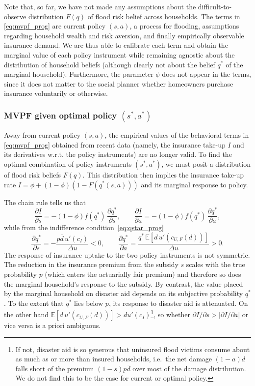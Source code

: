 \documentclass[12pt]{article}
\begin{document}
Note that, so far, we have not made any assumptions about the difficult-to-observe distribution $F(q)$ of flood risk belief across households. The terms in \eqref{eq:mvpf_prog} are current policy $(s,a)$, a process for flooding, assumptions regarding household wealth and risk aversion, and finally empirically observable insurance demand. We are thus able to calibrate each term and obtain the marginal value of each policy instrument while remaining agnostic about the distribution of household beliefs (although clearly not about the belief $q^*$ of the marginal household). Furthermore, the parameter $\phi$ does not appear in the terms, since it does not matter to the social planner whether homeowners purchase insurance voluntarily or otherwise.

\subsubsection{MVPF given optimal policy \texorpdfstring{$(s^*,a^*)$}{(s*,a*)}}
Away from current policy $(s,a)$, the empirical values of the behavioral terms in \eqref{eq:mvpf_prog} obtained from recent data (namely, the insurance take-up $I$ and its derivatives w.r.t. the policy instruments) are no longer valid. To find the optimal combination of policy instruments $(s^*,a^*)$, we must posit a distribution of flood risk beliefs $F(q)$. This distribution then implies the insurance take-up rate $I=\phi+(1-\phi)(1-F(q^*(s,a)))$ and its marginal response to policy.

The chain rule tells us that 
\begin{equation}\label{eq:partialsinsurance}
    \frac{\partial I}{\partial s} = -(1-\phi)f(q^*)\,\frac{\partial q^*}{\partial s}, \qquad
    \frac{\partial I}{\partial a} = -(1-\phi)f(q^*)\,\frac{\partial q^*}{\partial a},
\end{equation}
while from the indifference condition~\eqref{eq:qstar_prog} 
\begin{equation}\label{eq:partialsqstar}
    \frac{\partial q^*}{\partial s} = -\frac{p\overline{d}\,u'(c_I)}{\Delta u} < 0, \qquad
    \frac{\partial q^*}{\partial a} = \frac{q^*\,\mathbb{E}[d\,u'(c_{U,F}(d))]}{\Delta u} > 0.
\end{equation}
The response of insurance uptake to the two policy instruments is not symmetric. The reduction in the insurance premium from the subsidy $s$ scales with the true probability $p$ (which enters the actuarially fair premium) and therefore so does the marginal household's response to the subsidy. By contrast, the value placed by the marginal household on disaster aid depends on its subjective probability $q^*$. To the extent that $q^*$ lies below $p$, its response to disaster aid is attenuated. On the other hand $\mathbb{E}[d\,u'(c_{U,F}(d))]>\overline{d}u'(c_I)$\footnote{If not, disaster aid is so generous that uninsured flood victims consume about as much as or more than insured households, i.e.\ the net damage $(1-a)d$ falls short of the premium $(1-s)p\overline{d}$ over most of the damage distribution. We do not find this to be the case for current or optimal policy.}, so whether $\partial I/\partial s>|\partial I/\partial a|$ or vice versa is a priori ambiguous.
\end{document}
